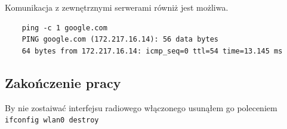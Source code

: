 \documentclass{article} %
\begin{document}
Komunikacja z zewnętrznymi serwerami równiż jest możliwa.
\begin{lstlisting}
    ping -c 1 google.com                                                                                                             
    PING google.com (172.217.16.14): 56 data bytes 
    64 bytes from 172.217.16.14: icmp_seq=0 ttl=54 time=13.145 ms
\end{lstlisting}

\subsection{Zakończenie pracy}
By nie zostaiwać interfejsu radiowego włączonego usunąłem go poleceniem \texttt{ifconfig wlan0 destroy}
\end{document}

